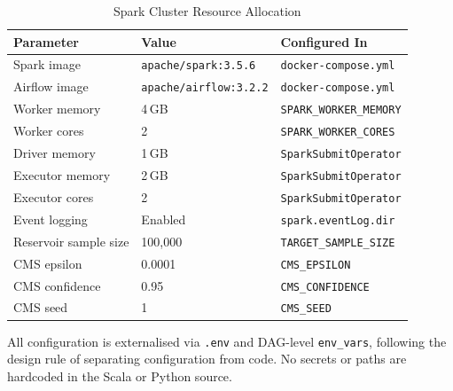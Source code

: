 \documentclass{article}
\begin{document}
\begin{table}[H]
\centering
\caption{Spark Cluster Resource Allocation}
\label{tab:resources}
\begin{tabular}{l l l}
\toprule
\textbf{Parameter} & \textbf{Value} & \textbf{Configured In} \\
\midrule
Spark image                & \texttt{apache/spark:3.5.6}     & \texttt{docker-compose.yml} \\
Airflow image              & \texttt{apache/airflow:3.2.2}   & \texttt{docker-compose.yml} \\
Worker memory              & 4\,GB                           & \texttt{SPARK\_WORKER\_MEMORY} \\
Worker cores               & 2                               & \texttt{SPARK\_WORKER\_CORES} \\
Driver memory              & 1\,GB                           & \texttt{SparkSubmitOperator} \\
Executor memory            & 2\,GB                           & \texttt{SparkSubmitOperator} \\
Executor cores             & 2                               & \texttt{SparkSubmitOperator} \\
Event logging              & Enabled                         & \texttt{spark.eventLog.dir} \\
Reservoir sample size      & 100{,}000                       & \texttt{TARGET\_SAMPLE\_SIZE} \\
CMS epsilon                & 0.0001                          & \texttt{CMS\_EPSILON} \\
CMS confidence             & 0.95                            & \texttt{CMS\_CONFIDENCE} \\
CMS seed                   & 1                               & \texttt{CMS\_SEED} \\
\bottomrule
\end{tabular}
\end{table}

All configuration is externalised via \texttt{.env} and DAG-level \texttt{env\_vars}, following the design rule of separating configuration from code. No secrets or paths are hardcoded in the Scala or Python source.


\end{document}
